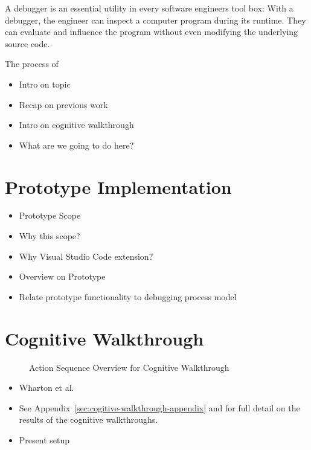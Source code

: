 \documentclass[sigplan,screen,nonacm,review]{acmart}
\begin{document}
A debugger is an essential utility in every software engineers tool box: With a debugger, the engineer can inspect a computer program during its runtime. They can evaluate and influence the program without even modifying the underlying source code.

The process of



\begin{itemize}
	\item Intro on topic
	\item Recap on previous work
	\item Intro on cognitive walkthrough \cite{Wharton_Rieman_Clayton_Polson_1994}
	\item What are we going to do here?
\end{itemize}

\section{Prototype Implementation}
\label{sec:prototype}

\begin{itemize}
	\item Prototype Scope
	\item Why this scope?
	\item Why Visual Studio Code extension?
	\item Overview on Prototype
	\item Relate prototype functionality to debugging process model \cite{Layman_Diep_Nagappan_Singer_Deline_Venolia_2013}
\end{itemize}

\section{Cognitive Walkthrough}
\label{sec:cogitive-walkthrough}

\begin{figure}
	\centering
	\Description{}
	\caption{Action Sequence Overview for Cognitive Walkthrough}
	\label{fig:steps-prototype}
\end{figure}

\begin{itemize}
	\item Wharton et al. \cite{Wharton_Rieman_Clayton_Polson_1994}
	\item See Appendix~\ref{sec:cogitive-walkthrough-appendix} and for full detail on the results of the cognitive walkthroughs.
	\item Present setup
\end{itemize}
\end{document}
